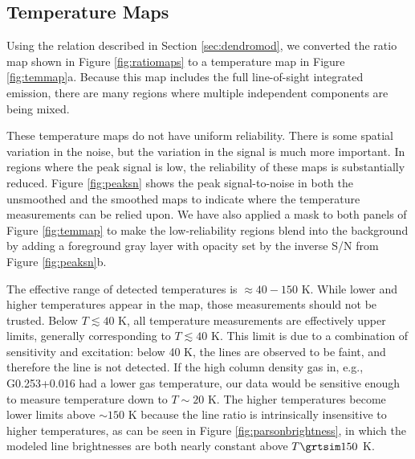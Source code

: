 \subsection{Temperature Maps}
\label{sec:formaldehydetemmap}
Using the relation described in Section \ref{sec:dendromod}, we
converted the ratio map shown in Figure \ref{fig:ratiomaps} to a temperature
map in Figure \ref{fig:temmap}a.  Because this map includes the full line-of-sight
integrated emission, there are many regions where multiple independent components
are being mixed.



These temperature maps do not have uniform reliability.  There
is some spatial variation in the noise, but the variation in the signal is much
more important.  In regions where the peak signal is low, the reliability of
these maps is substantially reduced.  Figure \ref{fig:peaksn} shows the peak
signal-to-noise in both the unsmoothed and the smoothed maps to indicate where
the temperature measurements can be relied upon.  We have also applied a mask
to both panels of Figure \ref{fig:temmap} to make the low-reliability regions
blend into the background by adding a foreground gray layer with opacity set by
the inverse S/N from Figure \ref{fig:peaksn}b.

The effective range of detected temperatures is $\approx40-150$ K. While lower
and higher temperatures appear in the map, those measurements should not be
trusted.  Below $T\lesssim40$ K, all temperature measurements are effectively
upper limits, generally corresponding to $T\lesssim40$ K.  This limit
is due to a combination of sensitivity and excitation: below 40 K, the \para
lines are observed to be faint, and therefore the \threetwoone line is not
detected.  If the high column density gas in, e.g., G0.253+0.016 had a lower
gas temperature, our data would be sensitive enough to measure temperature down
to $T\sim20$ K.  The higher temperatures become lower limits above $\sim150$ K
because the \para line ratio is intrinsically insensitive to higher
temperatures, as can be seen in Figure \ref{fig:parsonbrightness}, in which
the modeled line brightnesses are both nearly constant above $T\grtsim150$ K.



